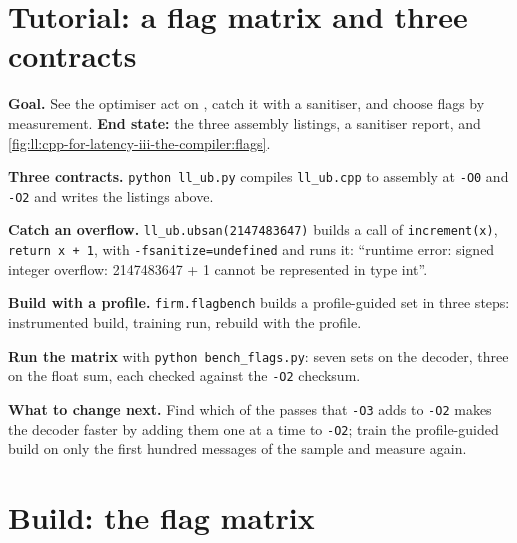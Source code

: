 \section{Tutorial: a flag matrix and three contracts}\label{tut:ll:cpp-for-latency-iii-the-compiler:tut}

\begin{tutorial}
\textbf{Goal.} See the optimiser act on , catch it with a sanitiser, and choose flags by measurement.
\textbf{End state:} the three assembly listings, a sanitiser report, and
\cref{fig:ll:cpp-for-latency-iii-the-compiler:flags}.
\begin{tutsteps}
\item \textbf{Three contracts.} \texttt{python ll\_ub.py} compiles \texttt{ll\_ub.cpp} to assembly at \texttt{-O0} and
\texttt{-O2} and writes the listings above.
\item \textbf{Catch an overflow.} \texttt{ll\_ub.ubsan(2147483647)} builds a call of \texttt{increment(x)}, \texttt{return
x + 1}, with \texttt{-fsanitize=undefined} and runs it: ``runtime error: signed integer overflow: 2147483647 + 1 cannot
be represented in type int''.
\item \textbf{Build with a profile.} \texttt{firm.flagbench} builds a profile-guided set in three steps: instrumented
build, training run, rebuild with the profile.
\label{lst:ll:cpp-for-latency-iii-the-compiler:build}
\item \textbf{Run the matrix} with \texttt{python bench\_flags.py}: seven sets on the decoder, three on the float sum, each
checked against the \texttt{-O2} checksum.
\end{tutsteps}
\textbf{What to change next.} Find which of the passes that \texttt{-O3} adds to \texttt{-O2} makes the decoder faster by
adding them one at a time to \texttt{-O2}; train the profile-guided build on only the first hundred messages of the sample
and measure again.
\end{tutorial}

\section{Build: the flag matrix}\label{bld:ll:cpp-for-latency-iii-the-compiler:flagbench}

